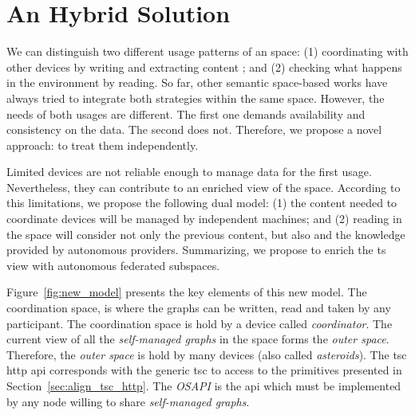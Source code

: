 \section{An Hybrid Solution} %
\label{sec:hybrid_solution}

We can distinguish two different usage patterns of an space:
(1) coordinating with other devices by writing and extracting content ; and %
(2) checking what happens in the environment by reading.
So far, other semantic space-based works have always tried to integrate both strategies within the same space.
However, the needs of both usages are different.
The first one demands availability and consistency on the data.
The second does not. %
Therefore, we propose a novel approach: to treat them independently.




Limited devices are not reliable enough to manage data for the first usage.
Nevertheless, they can contribute to an enriched view of the space.
According to this limitations, we propose the following dual model:
(1) the content needed to coordinate devices will be managed by independent machines; and
(2) reading in the space will consider not only the previous content, but also and the knowledge provided by autonomous providers.
Summarizing, we propose to enrich the \ac{ts} view with autonomous federated subspaces.


Figure~\ref{fig:new_model} presents the key elements of this new model.
The coordination space, is where the graphs can be written, read and taken by any participant.
The coordination space is hold by a device called \emph{coordinator}.
The current view of all the \emph{self-managed graphs} in the space forms the \emph{outer space}.
Therefore, the \emph{outer space} is hold by many devices (also called \emph{asteroids}).
The \ac{tsc} \ac{http} \ac{api} corresponds with the generic \ac{tsc} to access to the primitives presented in Section~\ref{sec:align_tsc_http}.
The \emph{OSAPI} is the \ac{api} which must be implemented by any node willing to share \emph{self-managed graphs}.



